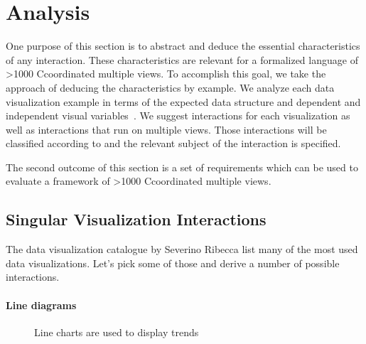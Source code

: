 \documentclass{article}
\newcommand\hmm[1]{\ifnum\ifhmode\spacefactor\else2000\fi>1000 \uppercase{#1}\else#1\fi}
\newcommand{\cmvs}{\hmm{c}oordinated multiple views}
\begin{document}
\clearpage
\section{Analysis}\label{sec:analysis}
One purpose of this section is to abstract and deduce the essential characteristics of any interaction.
These characteristics are relevant for a formalized language of \cmvs{}.
To accomplish this goal, we take the approach of deducing the characteristics by example.
We analyze each data visualization example in terms of the expected data structure and dependent and independent visual variables~\cite{Bertin2010}.
We suggest interactions for each visualization as well as interactions that run on multiple views. 
Those interactions will be classified according to \textcite{Yi2007} and the relevant subject of the interaction is specified.

The second outcome of this section is a set of requirements which can be used to evaluate a framework of \cmvs{}.


\subsection{Singular Visualization Interactions}\label{sec:analysis:examples}

The data visualization catalogue by Severino Ribecca list many of the most used data visualizations\cite{VisualizationCatalogue2017}.
Let's pick some of those and derive a number of possible interactions.



\paragraph{Line diagrams}
\begin{figure}
  \begin{center}
    \qquad
  \end{center}
  \caption{Line charts are used to display trends}\label{fig:concept:chart-types:line-diagrams}
\end{figure}
\end{document}
